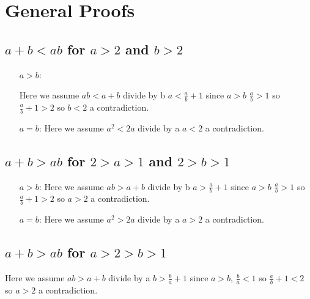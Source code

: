 \section{General Proofs}  

\subsection{$a+b < ab$ for $a>2$ and $b>2$}
\begin{mdframed}[style=darkAnswer,frametitle={Joe Starr}]
\begin{itemize}
  \item[$a>b$:]{
    Here we assume $ab< a+b$ divide by b $a< \frac{a}{b}+1$ 
    since $a>b$ $\frac{a}{b}>1$ so $\frac{a}{b}+1>2$ so $b<2$ a contradiction. 

  }
  \item[$a=b$:]{
    Here we assume $a^2< 2a$ divide by a $a< 2$ a contradiction. 
  }
\end{itemize}
\end{mdframed}

\subsection{$a+b > ab$ for $2>a>1$ and $2>b>1$}
\begin{mdframed}[style=darkAnswer,frametitle={Joe Starr}]
\begin{itemize}
  \item[$a>b$:]{
    Here we assume $ab> a+b$ divide by b $a> \frac{a}{b}+1$ 
    since $a>b$ $\frac{a}{b}>1$ so $\frac{a}{b}+1>2$ so $a>2$ a contradiction. 
  }
  \item[$a=b$:]{
    Here we assume $a^2> 2a$ divide by a $a> 2$ a contradiction. 
  }
\end{itemize}
\end{mdframed}

\subsection{$a+b > ab$ for $a>2>b>1$}
\begin{mdframed}[style=darkAnswer,frametitle={Joe Starr}]
    Here we assume $ab> a+b$ divide by a $b> \frac{b}{a}+1$ 
    since $a>b$, $\frac{b}{a}<1$ so $\frac{a}{b}+1<2$ so $a>2$ a contradiction. 
\end{mdframed}

